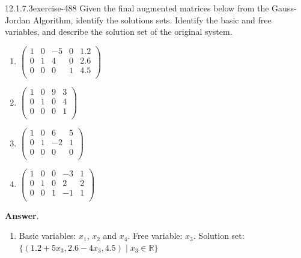 \documentclass[twoside,10pt,]{book}
\numberwithin{equation}{section}
\begin{document}
\begin{divisionsolution}{12.1.7.3}{}{exercise-488}%
\hypertarget{p-4393}{}%
Given the final augmented matrices below from the Gauss-Jordan Algorithm, identify the solutions sets. Identify the basic and free variables, and describe the solution set of the original system.\leavevmode%
\begin{multicols}{2}
\begin{enumerate}[label=(\alph*)]
\item\hypertarget{li-2013}{}\hypertarget{p-4394}{}%
\(\left(
\begin{array}{cccc|c}
1 & 0 & -5 & 0 & 1.2 \\
0 & 1 & 4 & 0 & 2.6 \\
0 & 0 & 0 & 1 & 4.5 \\
\end{array}
\right)\)%
\item\hypertarget{li-2014}{}\hypertarget{p-4395}{}%
\(\left(
\begin{array}{ccc|c}
1 & 0 & 9 & 3 \\
0 & 1 & 0 & 4 \\
0 & 0 & 0 & 1 \\
\end{array}
\right)\)%
\item\hypertarget{li-2015}{}\hypertarget{p-4396}{}%
\(\left(
\begin{array}{ccc|c}
1 & 0 & 6 & 5 \\
0 & 1 & -2 & 1 \\
0 & 0 & 0 & 0 \\
\end{array}
\right)\)%
\item\hypertarget{li-2016}{}\hypertarget{p-4397}{}%
\(\left(
\begin{array}{cccc|c}
1 & 0 & 0 & -3 & 1 \\
0 & 1 & 0 & 2 & 2 \\
0 & 0 & 1 & -1 & 1 \\
\end{array}
\right)\)%
\end{enumerate}
\end{multicols}
%
\par\smallskip%
\noindent\textbf{Answer}.\quad%
\hypertarget{p-4398}{}%
\leavevmode%
\begin{enumerate}[label=(\alph*)]
\item\hypertarget{li-2017}{}\hypertarget{p-4399}{}%
Basic variables: \(x_1\), \(x_2\) and \(x_4\).  Free variable: \(x_3\).  Solution set:  \(\{(1.2+5x_3, 2.6-4 x_3, 4.5) \mid x_3 \in \mathbb{R}\}\)%

\end{enumerate}
\end{divisionsolution}
\end{document}

